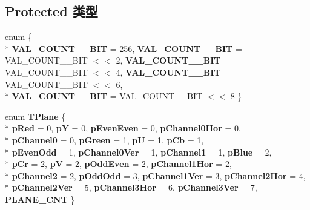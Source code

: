 \subsection*{Protected 类型}
\begin{DoxyCompactItemize}
\item 
\hypertarget{class_plot_canvas_image_analysis_adfd494e5094b11436e0feea4547f7879}{enum \{ \\*
{\bfseries V\+A\+L\+\_\+\+C\+O\+U\+N\+T\+\_\+\_\+\+B\+I\+T} = 256, 
{\bfseries V\+A\+L\+\_\+\+C\+O\+U\+N\+T\+\_\+\_\+\+B\+I\+T} = V\+A\+L\+\_\+\+C\+O\+U\+N\+T\+\_\+\_\+\+B\+I\+T $<$$<$ 2, 
{\bfseries V\+A\+L\+\_\+\+C\+O\+U\+N\+T\+\_\+\_\+\+B\+I\+T} = V\+A\+L\+\_\+\+C\+O\+U\+N\+T\+\_\+\_\+\+B\+I\+T $<$$<$ 4, 
{\bfseries V\+A\+L\+\_\+\+C\+O\+U\+N\+T\+\_\+\_\+\+B\+I\+T} = V\+A\+L\+\_\+\+C\+O\+U\+N\+T\+\_\+\_\+\+B\+I\+T $<$$<$ 6, 
\\*
{\bfseries V\+A\+L\+\_\+\+C\+O\+U\+N\+T\+\_\+\_\+\+B\+I\+T} = V\+A\+L\+\_\+\+C\+O\+U\+N\+T\+\_\+\_\+\+B\+I\+T $<$$<$ 8
 \}}\label{class_plot_canvas_image_analysis_adfd494e5094b11436e0feea4547f7879}

\item 
\hypertarget{class_plot_canvas_image_analysis_a13860f290e9ba4c7dc84e94784239695}{enum {\bfseries T\+Plane} \{ \\*
{\bfseries p\+Red} = 0, 
{\bfseries p\+Y} = 0, 
{\bfseries p\+Even\+Even} = 0, 
{\bfseries p\+Channel0\+Hor} = 0, 
\\*
{\bfseries p\+Channel0} = 0, 
{\bfseries p\+Green} = 1, 
{\bfseries p\+U} = 1, 
{\bfseries p\+Cb} = 1, 
\\*
{\bfseries p\+Even\+Odd} = 1, 
{\bfseries p\+Channel0\+Ver} = 1, 
{\bfseries p\+Channel1} = 1, 
{\bfseries p\+Blue} = 2, 
\\*
{\bfseries p\+Cr} = 2, 
{\bfseries p\+V} = 2, 
{\bfseries p\+Odd\+Even} = 2, 
{\bfseries p\+Channel1\+Hor} = 2, 
\\*
{\bfseries p\+Channel2} = 2, 
{\bfseries p\+Odd\+Odd} = 3, 
{\bfseries p\+Channel1\+Ver} = 3, 
{\bfseries p\+Channel2\+Hor} = 4, 
\\*
{\bfseries p\+Channel2\+Ver} = 5, 
{\bfseries p\+Channel3\+Hor} = 6, 
{\bfseries p\+Channel3\+Ver} = 7, 
{\bfseries P\+L\+A\+N\+E\+\_\+\+C\+N\+T}
 \}}\label{class_plot_canvas_image_analysis_a13860f290e9ba4c7dc84e94784239695}

\end{DoxyCompactItemize}

